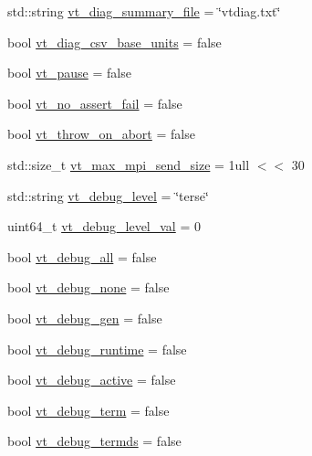 \begin{DoxyCompactItemize}
std\+::string \hyperlink{structvt_1_1arguments_1_1_app_config_a3a345aa1fff61f684a962161c1047856}{vt\+\_\+diag\+\_\+summary\+\_\+file} = \char`\"{}vtdiag.\+txt\char`\"{}
\item 
bool \hyperlink{structvt_1_1arguments_1_1_app_config_a9960924b4253fb072c3a44c9bd3c06ce}{vt\+\_\+diag\+\_\+csv\+\_\+base\+\_\+units} = false
\item 
bool \hyperlink{structvt_1_1arguments_1_1_app_config_a2064c7bded4e44c59316091cd193afc4}{vt\+\_\+pause} = false
\item 
bool \hyperlink{structvt_1_1arguments_1_1_app_config_ac9da4413611abdac83c9bd83722d7d4a}{vt\+\_\+no\+\_\+assert\+\_\+fail} = false
\item 
bool \hyperlink{structvt_1_1arguments_1_1_app_config_aace8ccaee4d2eef85fcf45f132743b64}{vt\+\_\+throw\+\_\+on\+\_\+abort} = false
\item 
std\+::size\+\_\+t \hyperlink{structvt_1_1arguments_1_1_app_config_aac217c9539cf7ee131cedc2c503ef866}{vt\+\_\+max\+\_\+mpi\+\_\+send\+\_\+size} = 1ull $<$$<$ 30
\item 
std\+::string \hyperlink{structvt_1_1arguments_1_1_app_config_a31f3dc5dce040c9c1cd5cba60eb7764d}{vt\+\_\+debug\+\_\+level} = \char`\"{}terse\char`\"{}
\item 
uint64\+\_\+t \hyperlink{structvt_1_1arguments_1_1_app_config_ad62c214067bb5c9165eb8cde688061f8}{vt\+\_\+debug\+\_\+level\+\_\+val} = 0
\item 
bool \hyperlink{structvt_1_1arguments_1_1_app_config_aac0dc7123449a6f4f3be90b4ef288ab9}{vt\+\_\+debug\+\_\+all} = false
\item 
bool \hyperlink{structvt_1_1arguments_1_1_app_config_a8b2bbece8ab4e091da537b2fc52669ea}{vt\+\_\+debug\+\_\+none} = false
\item 
bool \hyperlink{structvt_1_1arguments_1_1_app_config_a48d69aef2e39db18d9737e8888fd41f2}{vt\+\_\+debug\+\_\+gen} = false
\item 
bool \hyperlink{structvt_1_1arguments_1_1_app_config_a69b1371fb39fa1e541045c04cae8c28f}{vt\+\_\+debug\+\_\+runtime} = false
\item 
bool \hyperlink{structvt_1_1arguments_1_1_app_config_a506408dd0aad49b55666edfc525f8a29}{vt\+\_\+debug\+\_\+active} = false
\item 
bool \hyperlink{structvt_1_1arguments_1_1_app_config_af483dc1bffbd06359d89d937fd819b81}{vt\+\_\+debug\+\_\+term} = false
\item 
bool \hyperlink{structvt_1_1arguments_1_1_app_config_a25e50be9b687d7232a079a81d8e54e69}{vt\+\_\+debug\+\_\+termds} = false
$$
\end{DoxyCompactItemize}
